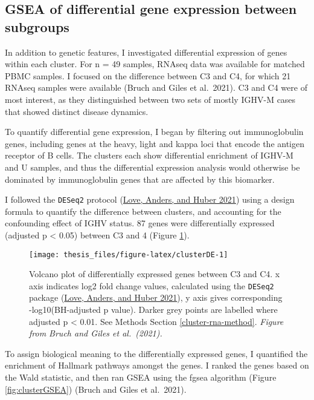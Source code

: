 \documentclass[11pt, a4paper, twosided]{book}
\begin{document}
\hypertarget{cluster-rna}{%
\subsection{GSEA of differential gene expression between subgroups}\label{cluster-rna}}

In addition to genetic features, I investigated differential expression of genes within each cluster. For n = 49 samples, RNAseq data was available for matched PBMC samples. I focused on the difference between C3 and C4, for which 21 RNAseq samples were available (Bruch and Giles et al.~2021). C3 and C4 were of most interest, as they distinguished between two sets of mostly IGHV-M cases that showed distinct disease dynamics.

To quantify differential gene expression, I began by filtering out immunoglobulin genes, including genes at the heavy, light and kappa loci that encode the antigen receptor of B cells. The clusters each show differential enrichment of IGHV-M and U samples, and thus the differential expression analysis would otherwise be dominated by immunoglobulin genes that are affected by this biomarker.

I followed the \texttt{DESeq2} protocol (\protect\hyperlink{ref-R-DESeq2}{Love, Anders, and Huber 2021}) using a design formula to quantify the difference between clusters, and accounting for the confounding effect of IGHV status. 87 genes were differentially expressed (adjusted p \textless{} 0.05) between C3 and 4 (Figure \ref{fig:clusterDE}).


\begin{figure}

{\centering \texttt{[image: thesis\_files/figure-latex/clusterDE-1]} 

}

\caption{Volcano plot of differentially expressed genes between C3 and C4. x axis indicates log2 fold change values, calculated using the \texttt{DESeq2} package (\protect\hyperlink{ref-R-DESeq2}{Love, Anders, and Huber 2021}), y axis gives corresponding -log10(BH-adjusted p value). Darker grey points are labelled where adjusted p \textless{} 0.01. See Methods Section \ref{cluster-rna-method}. \emph{Figure from Bruch and Giles et al.~(2021).}}\label{fig:clusterDE}
\end{figure}
To assign biological meaning to the differentially expressed genes, I quantified the enrichment of Hallmark pathways amongst the genes. I ranked the genes based on the Wald statistic, and then ran GSEA using the fgsea algorithm (Figure \ref{fig:clusterGSEA}) (Bruch and Giles et al.~2021).
\end{document}
